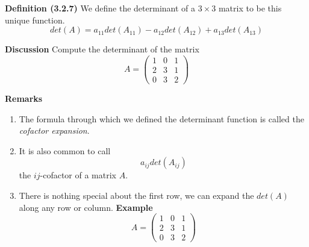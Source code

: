 \documentclass[letterpaper, 10pt]{article}
\begin{document}
\lb
\textbf{Definition (3.2.7)}
\lb
We define the determinant of a $3 \times 3$ matrix to be this unique function.
\[ det(A) = a_{11} det(A_{11}) - a_{12} det(A_{12}) + a_{13} det(A_{13}) \]





\vspace{200pt}
\lb
\textbf{Discussion}
\lb
Compute the determinant of the matrix
\[ A = \begin{pmatrix} 1 & 0 & 1 \\ 2 & 3 & 1 \\ 0 & 3 & 2 \end{pmatrix} \]






\newpage
\textbf{Remarks}
\lb
\begin{enumerate}
    \item The formula through which we defined the determinant function
        is called the \emph{cofactor expansion}.
    \item It is also common to call
        \[ a_{ij} det(A_{ij}) \]
        the $ij$-cofactor of a matrix $A$.
    \item
        There is nothing special about the first row, we can expand the $det(A)$ along
        any row or column.
        \lb
        \textbf{Example}
        \lb
        \[ A = \begin{pmatrix} 1 & 0 & 1 \\ 2 & 3 & 1 \\ 0 & 3 & 2 \end{pmatrix} \]
\end{enumerate}
\end{document}
